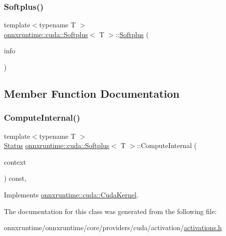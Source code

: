 \subsubsection{\texorpdfstring{Softplus()}{Softplus()}}
{\footnotesize\ttfamily template$<$typename T $>$ \\
\mbox{\hyperlink{classonnxruntime_1_1cuda_1_1Softplus}{onnxruntime\+::cuda\+::\+Softplus}}$<$ T $>$\+::\mbox{\hyperlink{classonnxruntime_1_1cuda_1_1Softplus}{Softplus}} (\begin{DoxyParamCaption}\item[{const \mbox{\hyperlink{classonnxruntime_1_1OpKernelInfo}{Op\+Kernel\+Info}} \&}]{info }\end{DoxyParamCaption})\hspace{0.3cm}{\ttfamily [inline]}}



\subsection{Member Function Documentation}
\mbox{\label{classonnxruntime_1_1cuda_1_1Softplus_a3ad8048f5c23f4edb87db9f86e419db8}} 
\subsubsection{\texorpdfstring{Compute\+Internal()}{ComputeInternal()}}
{\footnotesize\ttfamily template$<$typename T $>$ \\
\mbox{\hyperlink{classonnxruntime_1_1common_1_1Status}{Status}} \mbox{\hyperlink{classonnxruntime_1_1cuda_1_1Softplus}{onnxruntime\+::cuda\+::\+Softplus}}$<$ T $>$\+::Compute\+Internal (\begin{DoxyParamCaption}\item[{\mbox{\hyperlink{classonnxruntime_1_1OpKernelContext}{Op\+Kernel\+Context}} $\ast$}]{context }\end{DoxyParamCaption}) const\hspace{0.3cm}{\ttfamily [override]}, {\ttfamily [virtual]}}



Implements \mbox{\hyperlink{classonnxruntime_1_1cuda_1_1CudaKernel_aca7af04ae448017d6023d30bba231ebb}{onnxruntime\+::cuda\+::\+Cuda\+Kernel}}.



The documentation for this class was generated from the following file\+:\begin{DoxyCompactItemize}
\item 
onnxruntime/onnxruntime/core/providers/cuda/activation/\mbox{\hyperlink{cuda_2activation_2activations_8h}{activations.\+h}}\end{DoxyCompactItemize}
